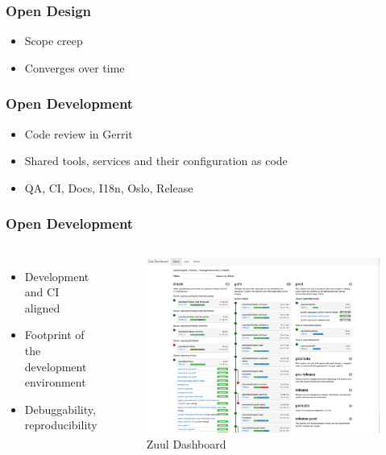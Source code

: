 \documentclass[aspectratio=169,11pt,hyperref={colorlinks=true}]{beamer}
\begin{document}
\begin{frame}
  \frametitle{Open Design}
    \begin{itemize}
        \item{Scope creep}
        \item{Converges over time}
    \end{itemize}
\end{frame}

\begin{frame}
  \frametitle{Open Development}
    \begin{itemize}
        \item{Code review in Gerrit}
        \item{Shared tools, services and their configuration as code}
        \item{QA, CI, Docs, I18n, Oslo, Release}
    \end{itemize}
\end{frame}

\begin{frame}
  \frametitle{Open Development}
    \begin{columns}
        \begin{itemize}
            \item{Development and CI aligned}
            \item{Footprint of the development environment}
            \item{Debuggability, reproducibility}
        \end{itemize}
          \begin{figure}
            \includegraphics[width=1\textwidth]{pictures/zuul_dashboard.png}
            \caption{Zuul Dashboard}
          \end{figure}
    \end{columns}
\end{frame}
\end{document}
